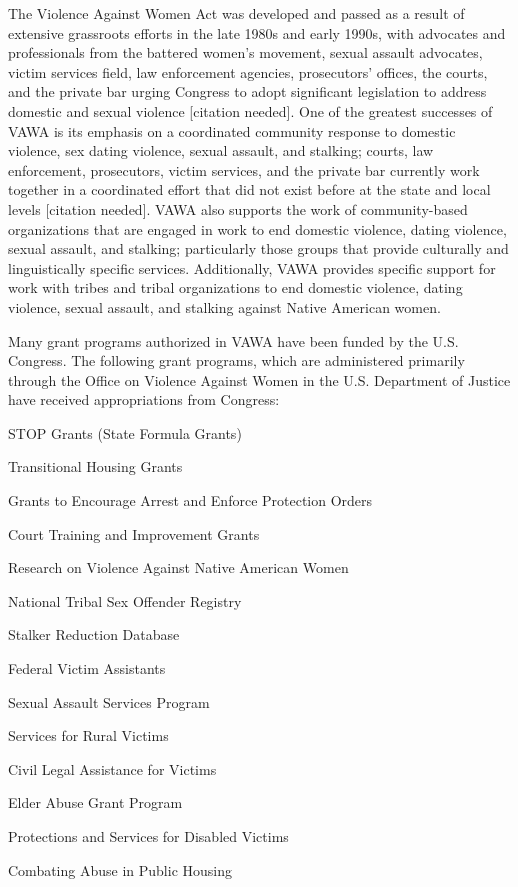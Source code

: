 The Violence Against Women Act was developed and passed as a result of
extensive grassroots efforts in the late 1980s and early 1990s, with
advocates and professionals from the battered women's movement, sexual
assault advocates, victim services field, law enforcement agencies,
prosecutors' offices, the courts, and the private bar urging Congress to
adopt significant legislation to address domestic and sexual violence
{[}citation needed{]}. One of the greatest successes of VAWA is its
emphasis on a coordinated community response to domestic violence, sex
dating violence, sexual assault, and stalking; courts, law enforcement,
prosecutors, victim services, and the private bar currently work
together in a coordinated effort that did not exist before at the state
and local levels {[}citation needed{]}. VAWA also supports the work of
community-based organizations that are engaged in work to end domestic
violence, dating violence, sexual assault, and stalking; particularly
those groups that provide culturally and linguistically specific
services. Additionally, VAWA provides specific support for work with
tribes and tribal organizations to end domestic violence, dating
violence, sexual assault, and stalking against Native American women.

Many grant programs authorized in VAWA have been funded by the U.S.
Congress. The following grant programs, which are administered primarily
through the Office on Violence Against Women in the U.S. Department of
Justice have received appropriations from Congress:

STOP Grants (State Formula Grants)

Transitional Housing Grants

Grants to Encourage Arrest and Enforce Protection Orders

Court Training and Improvement Grants

Research on Violence Against Native American Women

National Tribal Sex Offender Registry

Stalker Reduction Database

Federal Victim Assistants

Sexual Assault Services Program

Services for Rural Victims

Civil Legal Assistance for Victims

Elder Abuse Grant Program

Protections and Services for Disabled Victims

Combating Abuse in Public Housing

